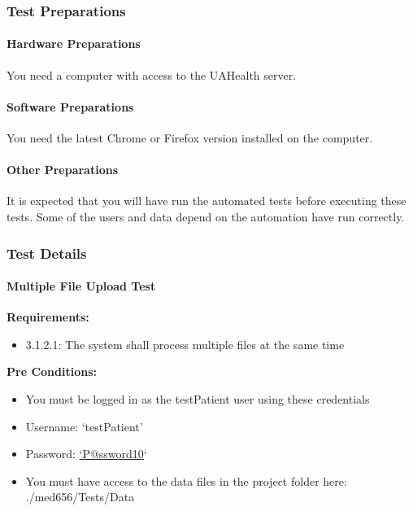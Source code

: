 \documentclass[letterpaper,10pt,english]{sphinxmanual}
\begin{document}
\subsubsection{Test Preparations}
\label{STD/manual_test_descriptions:test-preparations}

\paragraph{Hardware Preparations}
\label{STD/manual_test_descriptions:hardware-preparations}
You need a computer with access to the UAHealth server.


\paragraph{Software Preparations}
\label{STD/manual_test_descriptions:software-preparations}
You need the latest Chrome or Firefox version installed on the computer.


\paragraph{Other Preparations}
\label{STD/manual_test_descriptions:other-preparations}
It is expected that you will have run the automated tests before executing these tests. Some of the users and data
depend on the automation have run correctly.


\subsubsection{Test Details}
\label{STD/manual_test_descriptions:test-details}

\paragraph{Multiple File Upload Test}
\label{STD/manual_test_descriptions:multiple-file-upload-test}
\textbf{Requirements:}
\begin{itemize}
\item {} 
3.1.2.1: The system shall process multiple files at the same time

\end{itemize}

\textbf{Pre Conditions:}
\begin{itemize}
\item {} 
You must be logged in as the testPatient user using these credentials

\end{itemize}
\begin{itemize}
\item {} 
Username: `testPatient'

\item {} 
Password: \href{mailto:'P@ssword10}{`P@ssword10}`

\end{itemize}
\begin{itemize}
\item {} 
You must have access to the data files in the project folder here: ./med656/Tests/Data

\end{itemize}
\end{document}
